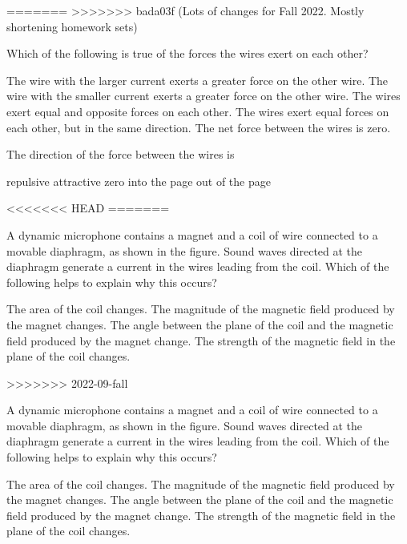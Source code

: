 \documentclass{../../oss-apphys-exam}
\begin{document}
\begin{multicols*}{2}
\begin{questions}
=======
>>>>>>> bada03f (Lots of changes for Fall 2022. Mostly shortening homework sets)

    \question Which of the following is true of the forces the wires exert on
    each other?
    \begin{choices}
      \choice The wire with the larger current exerts a greater force on the
      other wire.
      \choice The wire with the smaller current exerts a greater force on the
      other wire.
      \choice The wires exert equal and opposite forces on each other.
      \choice The wires exert equal forces on each other, but in the same
      direction.
      \choice The net force between the wires is zero.
    \end{choices}
    \label{q:2curr1}
    
    \question The direction of the force between the wires is
    \begin{choices}
      \choice repulsive
      \choice attractive
      \choice zero
      \choice into the page
      \choice out of the page
    \end{choices}
    \label{q:2curr2}
<<<<<<< HEAD
=======
    \vspace{.7in}
    
    \question A dynamic microphone contains a magnet and a coil of wire
    connected to a movable diaphragm, as shown in the figure. Sound waves
    directed at the diaphragm generate a current in the wires leading from the
    coil. Which of the following helps to explain why this occurs?
    \begin{choices}
      \choice The area of the coil changes.
      \choice The magnitude of the magnetic field produced by the magnet
      changes.
      \choice The angle between the plane of the coil and the magnetic field
      produced by the magnet change.
      \choice The strength of the magnetic field in the plane of the coil
      changes.
    \end{choices}
>>>>>>> 2022-09-fall
    \columnbreak
    
    \question A dynamic microphone contains a magnet and a coil of wire
    connected to a movable diaphragm, as shown in the figure. Sound waves
    directed at the diaphragm generate a current in the wires leading from the
    coil. Which of the following helps to explain why this occurs?
    \begin{choices}
      \choice The area of the coil changes.
      \choice The magnitude of the magnetic field produced by the magnet
      changes.
      \choice The angle between the plane of the coil and the magnetic field
      produced by the magnet change.
      \choice The strength of the magnetic field in the plane of the coil
      changes.
    \end{choices}
        

\end{questions}
\end{multicols*}
\end{document}
